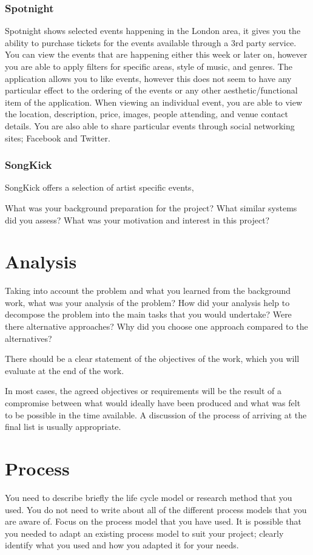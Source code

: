 		\subsubsection{Spotnight}
			Spotnight shows selected events happening in the London area, it gives you the ability to purchase tickets for the events available through a 3rd party service. You can view the events that are happening either this week or later on, however you are able to apply filters for specific areas, style of music, and genres. The application allows you to like events, however this does not seem to have any particular effect to the ordering of the events or any other aesthetic/functional item of the application. When viewing an individual event, you are able to view the location, description, price, images, people attending, and venue contact details. You are also able to share particular events through social networking sites; Facebook and Twitter. 
		
		\subsubsection{SongKick}
			SongKick offers a selection of artist specific events, 





What was your background preparation for the project? What similar systems did you assess? What was your motivation and interest in this project? 

\section{Analysis}

	

Taking into account the problem and what you learned from the background work, what was your analysis of the problem? How did your analysis help to decompose the problem into the main tasks that you would undertake? Were there alternative approaches? Why did you choose one approach compared to the alternatives? 

There should be a clear statement of the objectives of the work, which you will evaluate at the end of the work. 

In most cases, the agreed objectives or requirements will be the result of a compromise between what would ideally have been produced and what was felt to be possible in the time available. A discussion of the process of arriving at the final list is usually appropriate.

\section{Process}
You need to describe briefly the life cycle model or research method that you used. You do not need to write about all of the different process models that you are aware of. Focus on the process model that you have used. It is possible that you needed to adapt an existing process model to suit your project; clearly identify what you used and how you adapted it for your needs.

